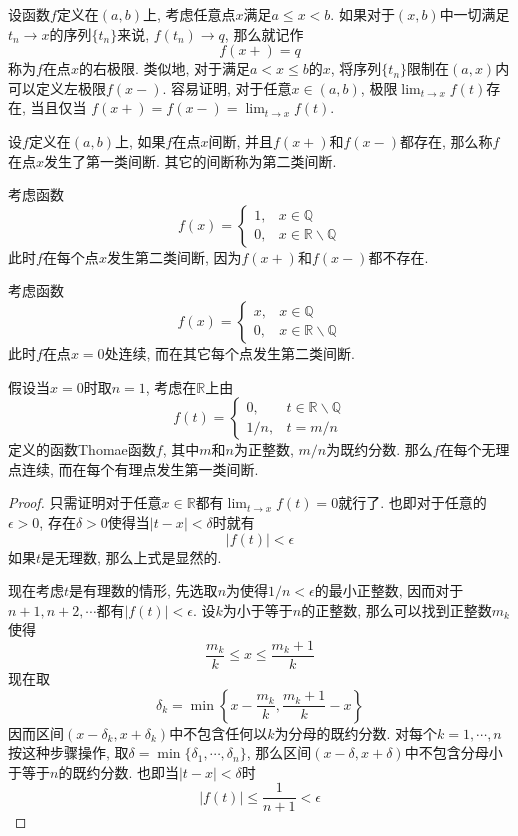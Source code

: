 \documentclass[cn,12pt,math=mtpro2,citestyle=gb7714-2015,bibstyle=gb7714-2015,twocol]{elegantbook}
\newcommand{\R}{\mathbb{R}}
\newcommand{\Q}{\mathbb{Q}}
\begin{document}
设函数$f$定义在$(a,b)$上, 考虑任意点$x$满足$a\leq x< b$. 如果对于$(x,b)$中一切满足$t_n\rightarrow x$的序列$\{t_n\}$来说, $f(t_n)\rightarrow q$, 那么就记作
$$f(x+)=q$$
称为$f$在点$x$的右极限. 类似地, 对于满足$a<x\leq b$的$x$, 将序列$\{t_n\}$限制在$(a,x)$内可以定义左极限$f(x-)$. 容易证明, 对于任意$x\in (a,b)$, 极限$\lim_{t\rightarrow x}f(t)$存在, 当且仅当
$f(x+)=f(x-)=\lim_{t\rightarrow x}f(t)$.
\begin{definition}
设$f$定义在$(a,b)$上, 如果$f$在点$x$间断, 并且$f(x+)$和$f(x-)$都存在, 那么称$f$在点$x$发生了第一类间断. 其它的间断称为第二类间断.
\end{definition}
\begin{example}
考虑函数
$$ f(x) = \begin{cases}
1, & x\in \Q \\
0, & x\in \R\backslash\Q \end{cases}$$
此时$f$在每个点$x$发生第二类间断, 因为$f(x+)$和$f(x-)$都不存在.
\end{example}

\begin{example}
考虑函数
$$ f(x) = \begin{cases}
x, & x\in \Q \\
0, & x\in \R\backslash\Q \end{cases}$$
此时$f$在点$x=0$处连续, 而在其它每个点发生第二类间断.
\end{example}
\begin{example}
假设当$x=0$时取$n=1$, 考虑在$\R$上由
$$f(t)=\begin{cases}
         0, & t\in\R\backslash\Q \\
         1/n, & t=m/n
       \end{cases}$$
定义的函数Thomae函数$f$, 其中$m$和$n$为正整数, $m/n$为既约分数. 那么$f$在每个无理点连续, 而在每个有理点发生第一类间断.
\end{example}
\begin{proof}
  只需证明对于任意$x\in\R$都有$\lim_{t\to x}f(t)=0$就行了. 也即对于任意的$\epsilon>0$, 存在$\delta>0$使得当$|t-x|<\delta$时就有
  $$|f(t)|<\epsilon$$
  如果$t$是无理数, 那么上式是显然的.

  现在考虑$t$是有理数的情形, 先选取$n$为使得$1/n<\epsilon$的最小正整数, 因而对于$n+1,n+2,\cdots$都有$|f(t)|<\epsilon$. 设$k$为小于等于$n$的正整数, 那么可以找到正整数$m_k$使得
  $$\frac{m_k}{k}\leq x \leq\frac{m_k+1}{k}$$
  现在取
  $$\delta_k=\min\left\{x-\frac{m_k}{k},\frac{m_k+1}{k}-x\right\}$$
  因而区间$(x-\delta_k,x+\delta_k)$中不包含任何以$k$为分母的既约分数. 对每个$k=1,\cdots,n$按这种步骤操作, 取$\delta=\min\{\delta_1,\cdots,\delta_n\}$, 那么区间$(x-\delta,x+\delta)$中不包含分母小于等于$n$的既约分数. 也即当$|t-x|<\delta$时
  $$|f(t)|\leq\frac{1}{n+1}<\epsilon$$

\end{proof}
\end{document}
